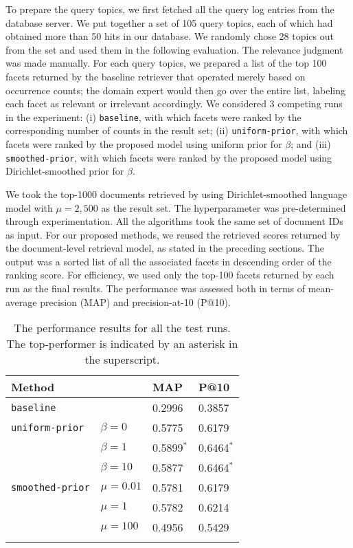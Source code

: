 
To prepare the query topics, we first fetched all the query log entries from
the database server.  We put together a set of 105 query topics, each of which
had obtained more than 50 hits in our database.  We randomly chose 28 topics
out from the set and used them in the following evaluation.  The relevance
judgment was made manually.  For each query topics, we prepared a list of
the top 100 facets returned by the baseline retriever that operated merely
based on occurrence counts; the domain expert would then go over the entire
list, labeling each facet as relevant or irrelevant accordingly.
We considered 3 competing runs in the experiment: (i) {\tt baseline}, with
which facets were ranked by the corresponding number of counts in the result
set; (ii) {\tt uniform-prior}, with which facets were ranked by the proposed
model using uniform prior for $\beta$; and (iii) {\tt smoothed-prior}, with
which facets were ranked by the proposed model using Dirichlet-smoothed prior
for $\beta$. 

We took the top-1000 documents retrieved by using Dirichlet-smoothed language
model with $\mu = 2,500$ as the result set.  The hyperparameter was
pre-determined through experimentation.  All the algorithms took the same set
of document IDs as input.  For our proposed methods, we reused the retrieved
scores returned by the document-level retrieval model, as stated in the
preceding sections.  The output was a sorted list of all the associated facets
in descending order of the ranking score.  For efficiency, we used only the
top-100 facets returned by each run as the final results.  The performance was
assessed both in terms of mean-average precision (MAP) and precision-at-10
(P@10).  

\begin{table}[ht!]
  \centering
  \begin{tabular}{llll}
    Method & & MAP & P@10 \\
    \hline
    {\tt baseline} & & 0.2996 & 0.3857 \\
    {\tt uniform-prior} & $\beta = 0$ & 0.5775 & 0.6179\\
    & $\beta = 1$ & 0.5899$^*$ & 0.6464$^*$ \\
    & $\beta = 10$ & 0.5877 & 0.6464$^*$ \\
    {\tt smoothed-prior} & $\mu = 0.01$ & 0.5781 & 0.6179 \\
    & $\mu = 1$ & 0.5782 & 0.6214 \\
    & $\mu = 100$ & 0.4956 & 0.5429 \\
    \\
  \end{tabular}
  \caption{The performance results for all the test runs.  The top-performer is indicated by an asterisk in the superscript.}
  \label{t:performance}
\end{table}

